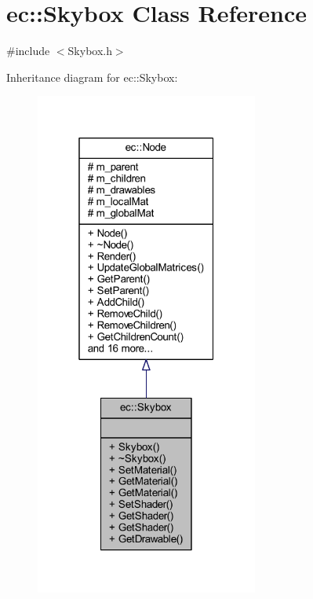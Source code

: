 \hypertarget{classec_1_1_skybox}{}\section{ec\+:\+:Skybox Class Reference}
\label{classec_1_1_skybox}


{\ttfamily \#include $<$Skybox.\+h$>$}



Inheritance diagram for ec\+:\+:Skybox\+:
\nopagebreak
\begin{figure}[H]
\begin{center}
\leavevmode
\includegraphics[width=208pt]{classec_1_1_skybox__inherit__graph}
\end{center}
\end{figure}


